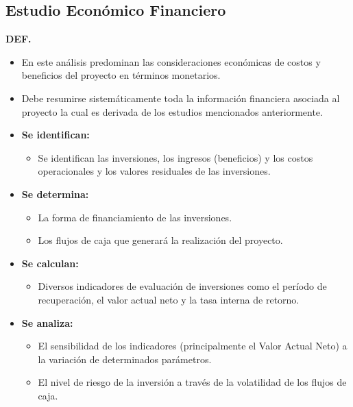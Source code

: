 \documentclass{templateNote}
\begin{document}
\subsection{Estudio Económico Financiero}\hypertarget{EEF}{}
\textbf{DEF.}
\begin{itemize}
  \item En este an\'alisis predominan las consideraciones econ\'omicas de costos y beneficios del proyecto en t\'erminos monetarios.
  \item Debe resumirse sistemáticamente toda la información financiera asociada al proyecto la cual es derivada de los estudios mencionados anteriormente.
  \item \textbf{Se identifican:}
  \begin{itemize}
    \item Se identifican las inversiones, los ingresos (beneficios) y los costos operacionales y los valores residuales de las inversiones.
  \end{itemize}
  \item \textbf{Se determina:}
  \begin{itemize}
    \item La forma de financiamiento de las inversiones.
    \item Los flujos de caja que generará la realización del proyecto.
  \end{itemize}
  \item \textbf{Se calculan:}
  \begin{itemize}
    \item Diversos indicadores de evaluación de inversiones como el período de recuperación, el valor actual neto y la tasa interna de retorno.
  \end{itemize}
  \item \textbf{Se analiza:}
  \begin{itemize}
    \item El sensibilidad de los indicadores (principalmente el Valor Actual Neto) a la variación de determinados parámetros.
    \item El nivel de riesgo de la inversión a través de la volatilidad de los flujos de caja.
  \end{itemize}
\end{itemize}

\newpage
\end{document}
